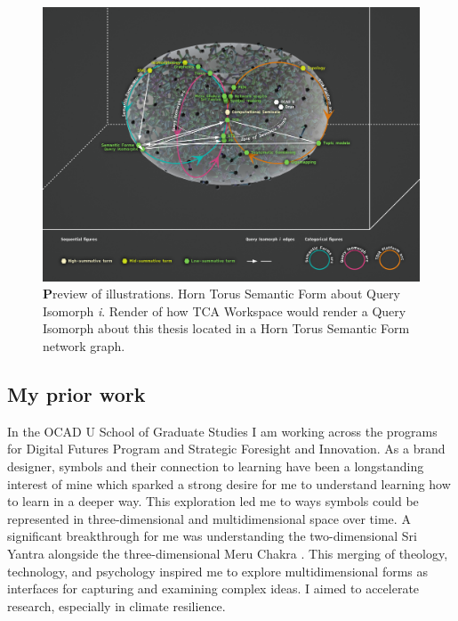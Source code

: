 \FloatBarrier
\begin{figure}[h]
    \centering
    \includegraphics[width=\textwidth]{figures/5.16.HT1.png}
    \caption[Preview of illustrations]{{\textbf Preview of illustrations.} Horn Torus Semantic Form about Query Isomorph \textit{i}. Render of how TCA Workspace would render a Query Isomorph about this thesis located in a Horn Torus Semantic Form network graph.}
    \label{f5.16.HT1}
\end{figure}

\FloatBarrier
\clearpage


\subsection{My prior work}
In the OCAD U School of Graduate Studies I am working across the programs for Digital Futures Program and Strategic Foresight and Innovation. As a brand designer, symbols and their connection to learning have been a longstanding interest of mine which sparked a strong desire for me to understand learning how to learn in a deeper way. This exploration led me to ways symbols could be represented in three-dimensional and multidimensional space over time. A significant breakthrough for me was understanding the two-dimensional Sri Yantra \citep[p. 2]{buhnemann_mandalas_2003} alongside the three-dimensional Meru Chakra \citep[p. 31]{buhnemann_mandalas_2003}. This merging of theology, technology, and psychology inspired me to explore multidimensional forms as interfaces for capturing and examining complex ideas. I aimed to accelerate research, especially in climate resilience.


